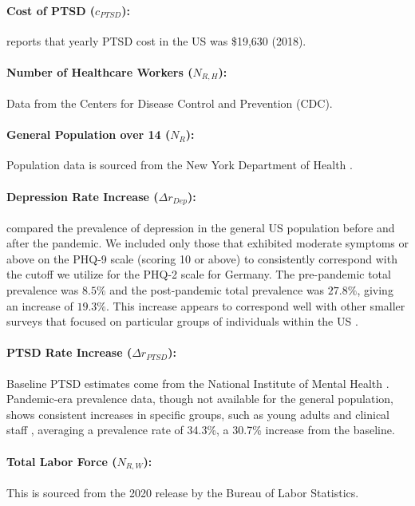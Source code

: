 \documentclass[msom,blindrev]{informs3} %
\begin{document}
\begin{APPENDICES}
\paragraph{Cost of PTSD ($c_{PTSD}$):}  reports that yearly PTSD cost in the US was \$19,630 (2018).

\paragraph{Number of Healthcare Workers ($N_{R,H}$):} Data from the Centers for Disease Control and Prevention (CDC).

\paragraph{General Population over 14 ($N_{R}$):} Population data is sourced from the New York Department of Health .
\paragraph{Depression Rate Increase ($\Delta r_{Dep}$):}  compared the prevalence of depression in the general US population before and after the pandemic. We included only those that exhibited moderate symptoms or above on the PHQ-9 scale (scoring 10 or above) to consistently correspond with the cutoff we utilize for the PHQ-2 scale for Germany. The pre-pandemic total prevalence was $8.5\%$ and the post-pandemic total prevalence was $27.8\%$, giving an increase of $19.3\%$. This increase appears to correspond well with other smaller surveys that focused on particular groups of individuals within the US . 

\paragraph{PTSD Rate Increase ($\Delta r_{PTSD}$):} Baseline PTSD estimates come from the National Institute of Mental Health . Pandemic-era prevalence data, though not available for the general population, shows consistent increases in specific groups, such as young adults  and clinical staff , averaging a prevalence rate of 34.3\%, a 30.7\% increase from the baseline.

\paragraph{Total Labor Force ($N_{R,W}$):} This is sourced from the 2020 release by the Bureau of Labor Statistics.


\end{APPENDICES}
\end{document}
